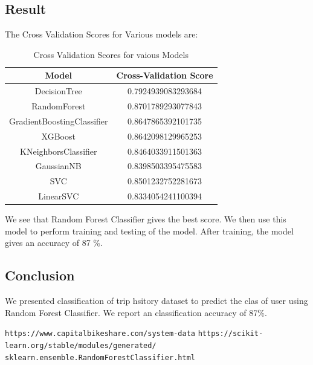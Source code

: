 \documentclass[a4paper, 12pt]{article}
\begin{document}
\newpage
\begin{center}
\section{Result}
\end{center}
\par 
The Cross Validation Scores for Various models are:
\begin{table}[h]
    \centering
    \begin{tabular}{|c|c|}
    \hline
         Model & Cross-Validation Score \\
    \hline
         DecisionTree & 0.7924939083293684\\
    \hline
    RandomForest & 0.8701789293077843\\
    \hline
    GradientBoostingClassifier & 0.8647865392101735\\
    \hline
    XGBoost & 0.8642098129965253\\
    \hline
    KNeighborsClassifier & 0.8464033911501363 \\
    \hline
    GaussianNB & 0.8398503395475583 \\
    \hline
    SVC & 0.8501232752281673 \\
    \hline
    LinearSVC & 0.8334054241100394 \\
    \hline
    \end{tabular}
    \caption{Cross Validation Scores for vaious Models}
\end{table}
\par We see that Random Forest Classifier gives the best score. We then use this model to perform training and testing of the model. After training, the model gives an accuracy of 87 \%.
\newpage
\begin{center}
\section{Conclusion}
\end{center}
We presented classification of trip hsitory dataset to predict the clas of user using Random Forest Classifier. We report an classification accuracy of 87\%.
\newpage
\begin{thebibliography}{1}
    \texttt{https://www.capitalbikeshare.com/system-data}
    \texttt{https://scikit-learn.org/stable/modules/generated/\\sklearn.ensemble.RandomForestClassifier.html}
\end{thebibliography}
\end{document}
